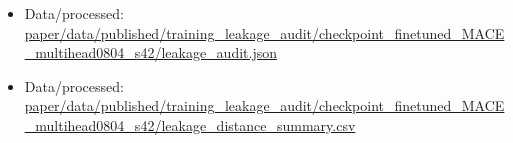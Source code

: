 \begin{itemize}[leftmargin=1.4em,noitemsep]
\item Data/processed: \begingroup\scriptsize\url{paper/data/published/training_leakage_audit/checkpoint_finetuned_MACE_multihead0804_s42/leakage_audit.json}\endgroup
\item Data/processed: \begingroup\scriptsize\url{paper/data/published/training_leakage_audit/checkpoint_finetuned_MACE_multihead0804_s42/leakage_distance_summary.csv}\endgroup
\end{itemize}
